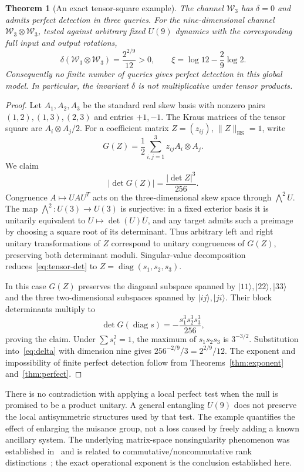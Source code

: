 \documentclass[11pt,a4paper]{article}
\newtheorem{theorem}{Theorem}[section]
\theoremstyle{remark}\newtheorem{remark}[theorem]{Remark}
\newcommand{\ket}[1]{\lvert #1\rangle}
\newcommand{\HS}{\mathrm{HS}}
\begin{document}
\begin{theorem}[An exact tensor-square example]\label{thm:tensor}
The channel $\mathcal W_3$ has $\delta=0$ and admits perfect detection in three queries. For the nine-dimensional channel $\mathcal W_3\otimes\mathcal W_3$, tested against arbitrary fixed $U(9)$ dynamics with the corresponding full input and output rotations,
\begin{equation}
\delta(\mathcal W_3\otimes\mathcal W_3)=\frac{2^{2/9}}{12}>0,
\qquad \xi=\log12-\frac29\log2.
\label{eq:tensor}
\end{equation}
Consequently no finite number of queries gives perfect detection in this global model. In particular, the invariant $\delta$ is not multiplicative under tensor products.
\end{theorem}
\begin{proof}
Let $A_1,A_2,A_3$ be the standard real skew basis with nonzero pairs $(1,2),(1,3),(2,3)$ and entries $+1,-1$. The Kraus matrices of the tensor square are $A_i\otimes A_j/2$. For a coefficient matrix $Z=(z_{ij})$, $\|Z\|_\HS=1$, write
\[
G(Z)=\frac12\sum_{i,j=1}^3z_{ij}A_i\otimes A_j.
\]
We claim
\begin{equation}
|\det G(Z)|=\frac{|\det Z|^3}{256}.\label{eq:tensor-det}
\end{equation}
Congruence $A\mapsto UAU^T$ acts on the three-dimensional skew space through $\bigwedge^2U$. The map $\bigwedge^2:U(3)\to U(3)$ is surjective: in a fixed exterior basis it is unitarily equivalent to $U\mapsto\det(U)\overline U$, and any target admits such a preimage by choosing a square root of its determinant. Thus arbitrary left and right unitary transformations of $Z$ correspond to unitary congruences of $G(Z)$, preserving both determinant moduli. Singular-value decomposition reduces~\eqref{eq:tensor-det} to $Z=\operatorname{diag}(s_1,s_2,s_3)$.

In this case $G(Z)$ preserves the diagonal subspace spanned by $\ket{11},\ket{22},\ket{33}$ and the three two-dimensional subspaces spanned by $\ket{ij},\ket{ji}$. Their block determinants multiply to
\[
\det G(\operatorname{diag}s)=-\frac{s_1^3s_2^3s_3^3}{256},
\]
proving the claim. Under $\sum s_i^2=1$, the maximum of $s_1s_2s_3$ is $3^{-3/2}$. Substitution into~\eqref{eq:delta} with dimension nine gives $256^{-2/9}/3=2^{2/9}/12$. The exponent and impossibility of finite perfect detection follow from Theorems~\ref{thm:exponent} and~\ref{thm:perfect}.
\end{proof}

There is no contradiction with applying a local perfect test when the null is promised to be a product unitary. A general entangling $U(9)$ does not preserve the local antisymmetric structures used by that test. The example quantifies the effect of enlarging the nuisance group, not a loss caused by freely adding a known ancillary system. The underlying matrix-space nonsingularity phenomenon was established in~\cite{li} and is related to commutative/noncommutative rank distinctions~\cite{ggow,derksen}; the exact operational exponent is the conclusion established here.
\end{document}

